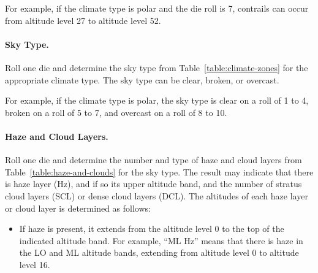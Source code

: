 \begin{advancedrules}
{For example, if the climate type is polar and the die roll is 7, contrails can occur from altitude level 27 to altitude level 52.

\paragraph{Sky Type.} Roll one die and determine the sky type from Table~\ref{table:climate-zones} for the appropriate climate type. The sky type can be clear, broken, or overcast.

For example, if the climate type is polar, the sky type is clear on a roll of 1 to 4, broken on a roll of 5 to 7, and overcast on a roll of 8 to 10.

\paragraph{Haze and Cloud Layers.} Roll one die and determine the number and type of haze and cloud layers from Table~\ref{table:haze-and-clouds} for the sky type. The result may indicate that there is haze layer (Hz), and if so its upper altitude band, and the number of stratus cloud layers (SCL) or dense cloud layers (DCL). The altitudes of each haze layer or cloud layer is determined as follows:

\begin{itemize}

\item If haze is present, it extends from the altitude level 0 to the top of the indicated altitude band. For example, “ML Hz” means that there is haze in the LO and ML altitude bands, extending from altitude level 0 to altitude level 16.




\end{itemize}}
\end{advancedrules}
